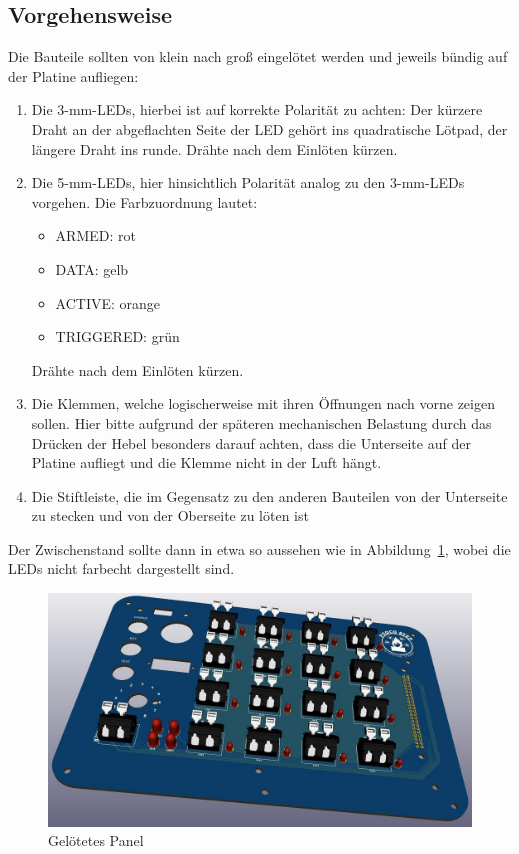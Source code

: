 \documentclass[paper=a4, open=any, numbers=noenddot]{scrbook}
\begin{document}
			\subsection*{Vorgehensweise}
				Die Bauteile sollten von klein nach groß eingelötet werden und jeweils bündig auf der Platine aufliegen:
				\begin{enumerate}
					\item Die 3-mm-LEDs, hierbei ist auf korrekte Polarität zu achten: Der kürzere Draht an der abgeflachten Seite der LED gehört ins quadratische Lötpad, der längere Draht ins runde. Drähte nach dem Einlöten kürzen.
					\item Die 5-mm-LEDs, hier hinsichtlich Polarität analog zu den 3-mm-LEDs vorgehen. Die Farbzuordnung lautet:
					      \begin{itemize}
						      \item ARMED: rot
						      \item DATA: gelb
						      \item ACTIVE: orange
						      \item TRIGGERED: grün
					      \end{itemize}
					      Drähte nach dem Einlöten kürzen.
					\item Die Klemmen, welche logischerweise mit ihren Öffnungen nach vorne zeigen sollen. Hier bitte aufgrund der späteren mechanischen Belastung durch das Drücken der Hebel besonders darauf achten, dass die Unterseite auf der Platine aufliegt und die Klemme nicht in der Luft hängt.
					\item Die Stiftleiste, die im Gegensatz zu den anderen Bauteilen von der Unterseite zu stecken und von der Oberseite zu löten ist
				\end{enumerate}

				Der Zwischenstand sollte dann in etwa so aussehen wie in Abbildung~\ref{fig:panel3d}, wobei die LEDs nicht farbecht dargestellt sind.

				\begin{figure}
					\centering\includegraphics[width=.8\textwidth]{panel3d}
					\caption{Gelötetes Panel}
					\label{fig:panel3d}
				\end{figure}
\end{document}
